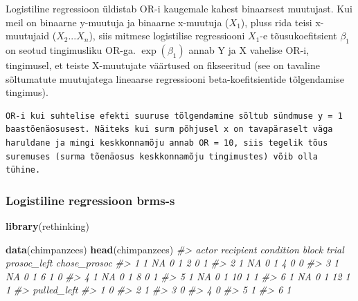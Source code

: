 \documentclass[]{book}
\newenvironment{Shaded}{\begin{snugshade}}{\end{snugshade}}
\newcommand{\CommentTok}[1]{\textcolor[rgb]{0.56,0.35,0.01}{\textit{#1}}}
\newcommand{\KeywordTok}[1]{\textcolor[rgb]{0.13,0.29,0.53}{\textbf{#1}}}
\newcommand{\NormalTok}[1]{#1}
\begin{document}
Logistiline regressioon üldistab OR-i kaugemale kahest binaarsest muutujast.
Kui meil on binaarne y-muutuja ja binaarne x-muutuja (\(X_1\)), pluss rida teisi x-muutujaid (\(X_2...X_n\)), siis mitmese logistilise regressiooni \(X_1\)-e tõusukoefitsient \(\beta_1\) on seotud tingimusliku OR-ga. \(\exp(\beta_1)\) annab Y ja X vahelise OR-i, tingimusel, et teiste X-muutujate väärtused on fikseeritud (see on tavaline sõltumatute muutujatega lineaarse regressiooni beta-koefitsientide tõlgendamise tingimus).

\begin{verbatim}
OR-i kui suhtelise efekti suuruse tõlgendamine sõltub sündmuse y = 1 
baastõenäosusest. Näiteks kui surm põhjusel x on tavapäraselt väga 
haruldane ja mingi keskkonnamõju annab OR = 10, siis tegelik tõus 
suremuses (surma tõenäosus keskkonnamõju tingimustes) võib olla tühine. 
\end{verbatim}

\hypertarget{logistiline-regressioon-brms-s}{%
\subsubsection{Logistiline regressioon brms-s}\label{logistiline-regressioon-brms-s}}

\begin{Shaded}
\begin{Highlighting}[]
\KeywordTok{library}\NormalTok{(rethinking)}
\end{Highlighting}
\end{Shaded}

\begin{Shaded}
\begin{Highlighting}[]
\KeywordTok{data}\NormalTok{(chimpanzees)}
\KeywordTok{head}\NormalTok{(chimpanzees)}
\CommentTok{#>   actor recipient condition block trial prosoc_left chose_prosoc}
\CommentTok{#> 1     1        NA         0     1     2           0            1}
\CommentTok{#> 2     1        NA         0     1     4           0            0}
\CommentTok{#> 3     1        NA         0     1     6           1            0}
\CommentTok{#> 4     1        NA         0     1     8           0            1}
\CommentTok{#> 5     1        NA         0     1    10           1            1}
\CommentTok{#> 6     1        NA         0     1    12           1            1}
\CommentTok{#>   pulled_left}
\CommentTok{#> 1           0}
\CommentTok{#> 2           1}
\CommentTok{#> 3           0}
\CommentTok{#> 4           0}
\CommentTok{#> 5           1}
\CommentTok{#> 6           1}
\end{Highlighting}
\end{Shaded}
\end{document}
